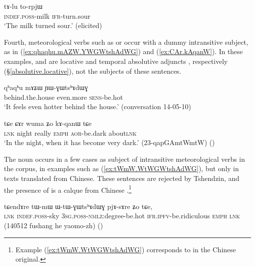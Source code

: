 \begin{exe}
\ex   \label{ex:tAlu.torpjW}
\gll    tɤ-lu to-rpjɯ \\
\textsc{indef}.\textsc{poss}-milk \textsc{ifr}-turn.sour \\
\glt `The milk turned sour.' (elicited)
\end{exe}

Fourth, meteorological verbs such as  or  occur with a dummy intransitive subject, as in (\ref{ex:qhaqhu.mAZW.YWGWtshAdWG}) and (\ref{ex:CAr.kAqanW}). In these examples,  and  are locative and temporal absolutive adjuncts , respectively (§\ref{absolutive.locative}), not the subjects of these sentences.

\begin{exe}
\ex   \label{ex:qhaqhu.mAZW.YWGWtshAdWG}
\gll qʰaqʰu mɤʑɯ ɲɯ-ɣɯtsʰɤdɯɣ \\
behind.the.house even.more \textsc{sens}-be.hot \\
\glt `It feels even hotter behind the house.' (conversation 14-05-10)
\end{exe}

\begin{exe}
\ex   \label{ex:CAr.kAqanW}
\gll  tɕe ɕɤr wuma ʑo kɤ-qanɯ tɕe \\
\textsc{lnk} night really \textsc{emph} \textsc{aor}-be.dark about\textsc{lnk} \\
\glt `In the night, when it has become very dark.' (23-qapGAmtWmtW)
()
\end{exe}

The noun  occurs in a few cases as subject of intransitive meteorological verbs in the corpus, in examples such as (\ref{ex:tWmW.WtWGWtshAdWG}), but only in texts translated from Chinese. These sentences are rejected by Tshendzin, and the presence of  is a calque from Chinese .\footnote{Example (\ref{ex:tWmW.WtWGWtshAdWG}) corresponds to  in the Chinese original.}

\begin{exe}
\ex   \label{ex:tWmW.WtWGWtshAdWG}
\gll tɕendɤre tɯ-mɯ ɯ-tɯ-ɣɯtsʰɤdɯɣ pjɤ-sɤre ʑo tɕe, \\
\textsc{lnk} \textsc{indef}.\textsc{poss}-sky \textsc{3sg}.\textsc{poss}-\textsc{nmlz}:degree-be.hot \textsc{ifr}.\textsc{ipfv}-be.ridiculous \textsc{emph} \textsc{lnk} \\
\glt (140512 fushang he yaomo-zh)	()
\end{exe}

